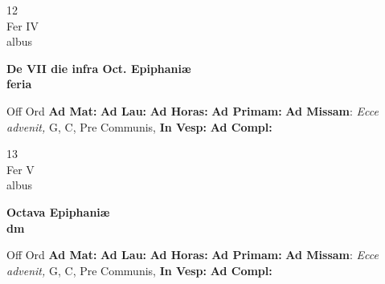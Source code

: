 \documentclass[10pt, openany]{book}
\begin{document}
    \begin{center}
        \begin{minipage}{3.5in}
            \vspace{2em}
            \begin{minipage}{0.5in}
                {\Huge 12} \\
                {\normalsize Fer IV} \\
                {\normalsize albus}
            \end{minipage}
            \begin{minipage}{3.0in}
                \textbf{ \large De VII die infra Oct. Epiphaniæ \\
                \textnormal{\normalsize feria}} \\ 
            \end{minipage}
            \begin{justify}Off Ord
                \textbf{Ad Mat: }
                \textbf{Ad Lau: }
                \textbf{Ad Horas: }
                \textbf{Ad Primam: }\textbf{Ad Missam}: \textit{Ecce advenit,} G, C, Pre Communis,  
                \textbf{In Vesp: }
                \textbf{Ad Compl: }
            \end{justify}
        \end{minipage}
    \end{center}

    \begin{center}
        \begin{minipage}{3.5in}
            \vspace{2em}
            \begin{minipage}{0.5in}
                {\Huge 13} \\
                {\normalsize Fer V} \\
                {\normalsize albus}
            \end{minipage}
            \begin{minipage}{3.0in}
                \textbf{ \large Octava Epiphaniæ \\
                \textnormal{\normalsize dm}} \\ 
            \end{minipage}
            \begin{justify}Off Ord
                \textbf{Ad Mat: }
                \textbf{Ad Lau: }
                \textbf{Ad Horas: }
                \textbf{Ad Primam: }\textbf{Ad Missam}: \textit{Ecce advenit,} G, C, Pre Communis,  
                \textbf{In Vesp: }
                \textbf{Ad Compl: }
            \end{justify}
        \end{minipage}
    \end{center}
\end{document}
